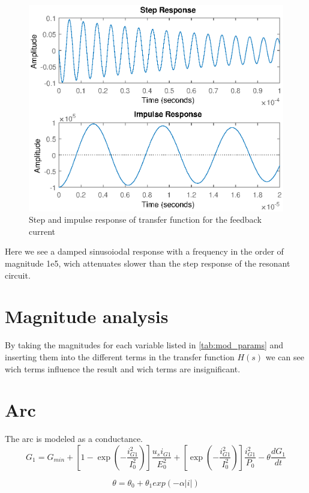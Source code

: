 \begin{figure}[h]
    \centering
    \includegraphics[width=\textwidth]{img/FeedbackResponse.eps}
    \caption{Step and impulse response of transfer function for the feedback current}
    \label{fig:fb_step}
\end{figure}

Here we see a damped sinusoiodal response with a frequency in the order of magnitude 1e5, wich attenuates slower than the step response of the resonant circuit.

\newpage
\section{Magnitude analysis}
By taking the magnitudes for each variable listed in \cref{tab:mod_params} and inserting them into the different terms in the transfer function $H(s)$ we can see wich terms influence the result and wich terms are insignificant.

\section{Arc}
\label{sec:arc}
The arc is modeled as a conductance.
\begin{equation} \label{eq:g1}
    G_1 = G_{min} + [ 1 - \exp(-\frac{i_{G1}^2}{I_0^2})] \frac{u_s i_{G1}}{E_0^2} + [\exp(-\frac{i_{G1}^2}{I_0^2})] \frac{i_{G1}^2}{P_0} - \theta \frac{d G_1}{dt}
\end{equation}

\begin{equation}
    \theta = \theta_0 + \theta_1 exp(-\alpha |i|)
\end{equation}

